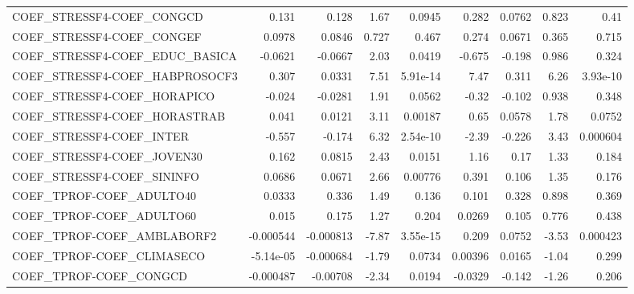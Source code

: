 \begin{tabular}{lrrrrrrrr}
COEF\_STRESSF4-COEF\_CONGCD              &       0.131 &        0.128 &     1.67 &   0.0945 &      0.282 &      0.0762 &        0.823 &          0.41 \\
COEF\_STRESSF4-COEF\_CONGEF              &      0.0978 &       0.0846 &    0.727 &    0.467 &      0.274 &      0.0671 &        0.365 &         0.715 \\
COEF\_STRESSF4-COEF\_EDUC\_BASICA         &     -0.0621 &      -0.0667 &     2.03 &   0.0419 &     -0.675 &      -0.198 &        0.986 &         0.324 \\
COEF\_STRESSF4-COEF\_HABPROSOCF3         &       0.307 &       0.0331 &     7.51 & 5.91e-14 &       7.47 &       0.311 &         6.26 &      3.93e-10 \\
COEF\_STRESSF4-COEF\_HORAPICO            &      -0.024 &      -0.0281 &     1.91 &   0.0562 &      -0.32 &      -0.102 &        0.938 &         0.348 \\
COEF\_STRESSF4-COEF\_HORASTRAB           &       0.041 &       0.0121 &     3.11 &  0.00187 &       0.65 &      0.0578 &         1.78 &        0.0752 \\
COEF\_STRESSF4-COEF\_INTER               &      -0.557 &       -0.174 &     6.32 & 2.54e-10 &      -2.39 &      -0.226 &         3.43 &      0.000604 \\
COEF\_STRESSF4-COEF\_JOVEN30             &       0.162 &       0.0815 &     2.43 &   0.0151 &       1.16 &        0.17 &         1.33 &         0.184 \\
COEF\_STRESSF4-COEF\_SININFO             &      0.0686 &       0.0671 &     2.66 &  0.00776 &      0.391 &       0.106 &         1.35 &         0.176 \\
COEF\_TPROF-COEF\_ADULTO40               &      0.0333 &        0.336 &     1.49 &    0.136 &      0.101 &       0.328 &        0.898 &         0.369 \\
COEF\_TPROF-COEF\_ADULTO60               &       0.015 &        0.175 &     1.27 &    0.204 &     0.0269 &       0.105 &        0.776 &         0.438 \\
COEF\_TPROF-COEF\_AMBLABORF2             &   -0.000544 &    -0.000813 &    -7.87 & 3.55e-15 &      0.209 &      0.0752 &        -3.53 &      0.000423 \\
COEF\_TPROF-COEF\_CLIMASECO              &   -5.14e-05 &    -0.000684 &    -1.79 &   0.0734 &    0.00396 &      0.0165 &        -1.04 &         0.299 \\
COEF\_TPROF-COEF\_CONGCD                 &   -0.000487 &     -0.00708 &    -2.34 &   0.0194 &    -0.0329 &      -0.142 &        -1.26 &         0.206 \\

\end{tabular}
